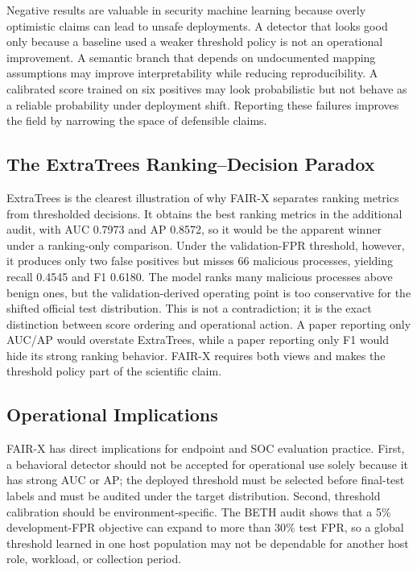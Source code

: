 \documentclass[10pt,journal,compsoc]{IEEEtran}
\begin{document}
Negative results are valuable in security machine learning because overly optimistic claims can lead to unsafe deployments. A detector that looks good only because a baseline used a weaker threshold policy is not an operational improvement. A semantic branch that depends on undocumented mapping assumptions may improve interpretability while reducing reproducibility. A calibrated score trained on six positives may look probabilistic but not behave as a reliable probability under deployment shift. Reporting these failures improves the field by narrowing the space of defensible claims.

\subsection{The ExtraTrees Ranking--Decision Paradox}

ExtraTrees is the clearest illustration of why FAIR-X separates ranking metrics from thresholded decisions. It obtains the best ranking metrics in the additional audit, with AUC 0.7973 and AP 0.8572, so it would be the apparent winner under a ranking-only comparison. Under the validation-FPR threshold, however, it produces only two false positives but misses 66 malicious processes, yielding recall 0.4545 and F1 0.6180. The model ranks many malicious processes above benign ones, but the validation-derived operating point is too conservative for the shifted official test distribution. This is not a contradiction; it is the exact distinction between score ordering and operational action. A paper reporting only AUC/AP would overstate ExtraTrees, while a paper reporting only F1 would hide its strong ranking behavior. FAIR-X requires both views and makes the threshold policy part of the scientific claim.

\subsection{Operational Implications}

FAIR-X has direct implications for endpoint and SOC evaluation practice. First, a behavioral detector should not be accepted for operational use solely because it has strong AUC or AP; the deployed threshold must be selected before final-test labels and must be audited under the target distribution. Second, threshold calibration should be environment-specific. The BETH audit shows that a 5\% development-FPR objective can expand to more than 30\% test FPR, so a global threshold learned in one host population may not be dependable for another host role, workload, or collection period.
\end{document}
